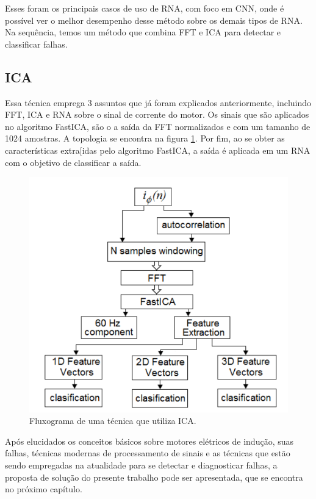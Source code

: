 Esses foram os principais casos de uso de RNA, com foco em CNN, onde é possível ver o melhor desempenho desse método sobre os demais
tipos de RNA. Na sequência, temos um método que combina FFT e ICA para detectar e classificar falhas.

% 

\subsection{ICA}

Essa técnica emprega 3 assuntos que já foram explicados anteriormente, incluindo FFT, ICA e RNA sobre o sinal de corrente
do motor. Os sinais que são aplicados no algoritmo FastICA, são o a saída da FFT normalizados e com um tamanho de 1024 amostras. 
A topologia se encontra na figura \ref{fig:ica_bracamonte_p4}. Por fim, ao se obter as características extra[idas pelo algoritmo FastICA,
a saída é aplicada em um RNA com o objetivo de classificar a saída.

\begin{figure}[H]
    \caption{Fluxograma de uma técnica que utiliza ICA.}
    \begin{center}
        \includegraphics[scale=.5]{referencial/img/ica_bracamonte_p4.png}
    \end{center}
    \label{fig:ica_bracamonte_p4}
\end{figure}


Após elucidados os conceitos básicos sobre motores elétricos de indução, suas falhas, técnicas modernas de processamento de sinais e as 
técnicas que estão sendo empregadas na atualidade para se detectar e diagnosticar falhas, a proposta de solução do presente trabalho 
pode ser apresentada, que se encontra no próximo capítulo.